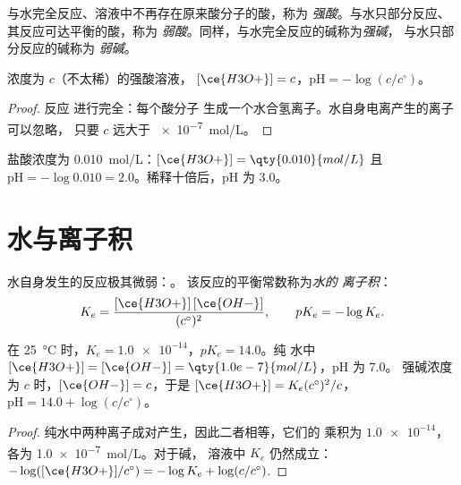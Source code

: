 \begin{definition}[强酸、弱酸与强碱、弱碱]\label{def:g12:ka-and-pka:strong-acid}
与水完全反应、溶液中不再存在原来酸分子的酸，称为
\emph{强酸}。与水只部分反应、其反应可达平衡的酸，称为
\emph{弱酸}。同样，与水完全反应的碱称为\emph{强碱}，
与水只部分反应的碱称为
\emph{弱碱}。
\end{definition}

\begin{proposition}[强酸的 pH]\label{prop:g12:ka-and-pka:strong}
浓度为 $c$（不太稀）的强酸溶液，
$[\ce{H3O+}] = c$，$\mathrm{pH} = -\log(c/c^\circ)$。
\end{proposition}

\begin{proof}
反应  进行完全：每个酸分子
生成一个水合氢离子。水自身电离产生的离子可以忽略，
只要 $c$ 远大于 \qty{e-7}{mol/L}。
\end{proof}

\begin{example}[盐酸]\label{ex:g12:ka-and-pka:hcl}
盐酸浓度为 \qty{0.010}{mol/L}：$[\ce{H3O+}] = \qty{0.010}{mol/L}$
且 $\mathrm{pH} = -\log 0.010 = 2.0$。稀释十倍后，pH 为 3.0。
\end{example}

\section{水与离子积}


\begin{definition}[水的离子积]\label{def:g12:ka-and-pka:ionic-product}
水自身发生的反应极其微弱：。
该反应的平衡常数称为\emph{水的
离子积}：
\[
  K_e = \frac{[\ce{H3O+}]\,[\ce{OH-}]}{(c^\circ)^2},
  \qquad pK_e = -\log K_e .
\]
\end{definition}

\begin{proposition}[中性水与强碱]\label{prop:g12:ka-and-pka:ke}
在 \qty{25}{\celsius} 时，$K_e = \num{1.0e-14}$，$pK_e = 14.0$。纯
水中 $[\ce{H3O+}] = [\ce{OH-}] = \qty{1.0e-7}{mol/L}$，pH 为 7.0。
强碱浓度为 $c$ 时，$[\ce{OH-}] = c$，于是
$[\ce{H3O+}] = K_e (c^\circ)^2 / c$，$\mathrm{pH} = 14.0 + \log(c/c^\circ)$。
\end{proposition}

\begin{proof}
纯水中两种离子成对产生，因此二者相等，它们的
乘积为 $\num{1.0e-14}$，各为 \qty{1.0e-7}{mol/L}。对于碱，
溶液中 $K_e$ 仍然成立：
$-\log([\ce{H3O+}]/c^\circ) = -\log K_e + \log(c/c^\circ)$.
\end{proof}

